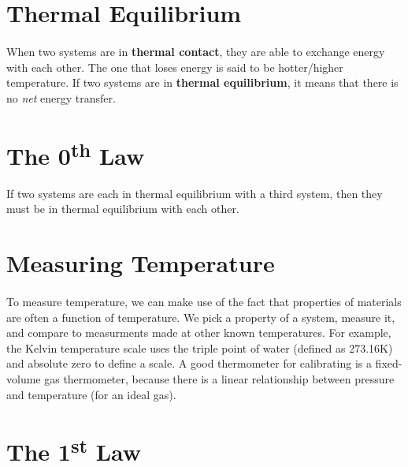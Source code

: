 \documentclass[../thermodynamics.tex]{subfiles}
\begin{document}
    \section{Thermal Equilibrium}
        \paragraph{}
        When two systems are in \textbf{thermal contact}, they are able to exchange energy with each other.
        The one that loses energy is said to be hotter/higher temperature.
        If two systems are in \textbf{thermal equilibrium}, it means that there is no \textit{net} energy transfer.

    \section{The 0\textsuperscript{th} Law}
        \begin{definition}
            If two systems are each in thermal equilibrium with a third system, then they must be in thermal equilibrium with each other.
        \end{definition}

    \section{Measuring Temperature}
        \paragraph{}
        To measure temperature, we can make use of the fact that properties of materials are often a function of temperature.
        We pick a property of a system, measure it, and compare to measurments made at other known temperatures.
        For example, the Kelvin temperature scale uses the triple point of water (defined as 273.16K) and absolute zero to define a scale.
        A good thermometer for calibrating is a fixed-volume gas thermometer, because there is a linear relationship between pressure and temperature (for an ideal gas).

    \section{The 1\textsuperscript{st} Law}
\end{document}
